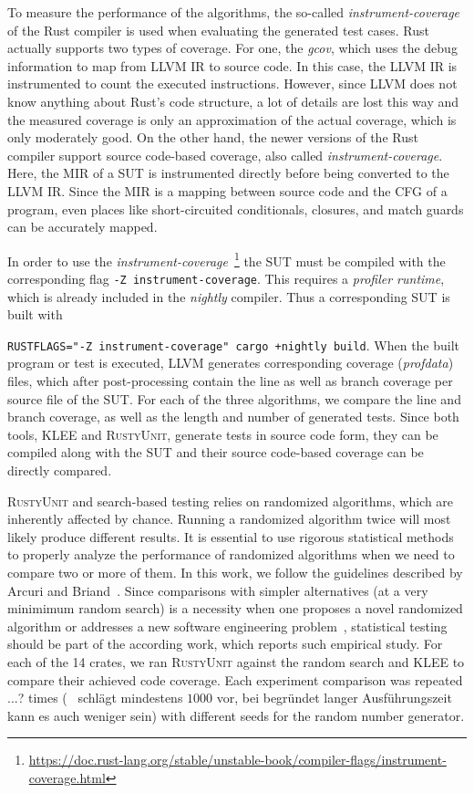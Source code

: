 \documentclass[paper=a4,%
  twoside,%
  BCOR4mm,%
  abstract=true,%
  toc=bibliography,%
  chapterprefix=true,%
  toc=bibliographynumbered,%
  open=right,%
  english,%
  pagesize=pdftex]{scrreprt}
\newcommand{\tech}{\textsc{RustyUnit}\xspace}
\newcommand{\mir}{\ac{MIR}\xspace}
\newcommand{\cfg}{\ac{CFG}\xspace}
\begin{document}
To measure the performance of the algorithms, the so-called \emph{instrument-coverage} of the Rust compiler is used when evaluating the generated test cases. Rust actually supports two types of coverage. For one, the \emph{gcov}, which uses the debug information to map from LLVM \ac{IR} to source code. In this case, the LLVM \ac{IR} is instrumented to count the executed instructions. However, since LLVM does not know anything about Rust's code structure, a lot of details are lost this way and the measured coverage is only an approximation of the actual coverage, which is only moderately good. On the other hand, the newer versions of the Rust compiler support source code-based coverage, also called \emph{instrument-coverage}. Here, the \mir of a \ac{SUT} is instrumented directly before being converted to the LLVM \ac{IR}. Since the \mir is a mapping between source code and the \cfg of a program, even places like short-circuited conditionals, closures, and match guards can be accurately mapped.

In order to use the \emph{instrument-coverage}~\footnote{\url{https://doc.rust-lang.org/stable/unstable-book/compiler-flags/instrument-coverage.html}} the SUT must be compiled with the corresponding flag \texttt{-Z instrument-coverage}. This requires a \emph{profiler runtime}, which is already included in the \emph{nightly} compiler. Thus a corresponding SUT is built with \raggedright\texttt{RUSTFLAGS="-Z instrument-coverage" cargo +nightly build}. When the built program or test is executed, LLVM generates corresponding coverage (\emph{profdata}) files, which after post-processing contain the line as well as branch coverage per source file of the \ac{SUT}. For each of the three algorithms, we compare the line and branch coverage, as well as the length and number of generated tests. Since both tools, \textsc{KLEE} and \tech, generate tests in source code form, they can be compiled along with the \ac{SUT} and their source code-based coverage can be directly compared.

\tech and search-based testing relies on randomized algorithms, which are inherently affected by chance. Running a randomized algorithm twice will most likely produce different results. It is essential to use rigorous statistical methods to properly analyze the performance of randomized algorithms when we need to compare two or more of them. In this work, we follow the guidelines described by Arcuri and Briand~\cite{Arcuri2011}. Since comparisons with simpler alternatives (at a very minimimum random search) is a necessity when one proposes a novel randomized algorithm or addresses a new software engineering problem~\cite{Ali2010}, statistical testing should be part of the according work, which reports such empirical study. For each of the 14 crates, we ran \tech against the random search and \textsc{KLEE} to compare their achieved code coverage. Each experiment comparison was repeated ...? times (~\cite{Arcuri2011} schlägt mindestens $1000$ vor, bei begründet langer Ausführungszeit kann es auch weniger sein) with different seeds for the random number generator.
\end{document}
